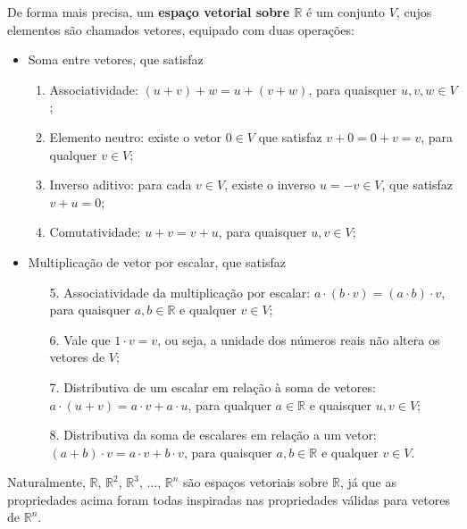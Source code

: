 \documentclass[../livro.tex]{subfiles}  %
\begin{document}
De forma mais precisa, um \textbf{espaço vetorial sobre $\mathbb{R}$} é um conjunto $V$, cujos elementos são chamados vetores, equipado com duas operações:
\begin{itemize}
	\item Soma entre vetores, que satisfaz
	\begin{enumerate}
		\item Associatividade: $(u+v)+w=u+(v+w)$, para quaisquer $u,v,w \in V$;
		\item Elemento neutro: existe o vetor $0 \in V$ que satisfaz $v+0=0+v=v$, para qualquer $v \in V$;
		\item Inverso aditivo: para cada $v \in V$, existe o inverso $u= -v \in V$, que satisfaz $v+u=0$;
		\item Comutatividade: $u+v = v+u$, para quaisquer $u, v \in V$;
	\end{enumerate}
	\item Multiplicação de vetor por escalar, que satisfaz
	\begin{enumerate}
		\item[5.] Associatividade da multiplicação por escalar: $a\cdot (b\cdot v)=(a\cdot b)\cdot v$, para quaisquer $a,b \in \mathbb{R}$ e qualquer $v \in V$;
		\item[6.] Vale que $1 \cdot v = v$, ou seja, a unidade dos números reais não altera os vetores de $V$;
		\item[7.] Distributiva de um escalar em relação à soma de vetores: $a \cdot (u+v) = a\cdot v+a\cdot u$, para qualquer $a \in \mathbb{R}$ e quaisquer $u,v \in V$;
		\item[8.] Distributiva da soma de escalares em relação a um vetor: $(a+b) \cdot v = a \cdot v+b \cdot v$, para quaisquer $a,b \in \mathbb{R}$ e qualquer $v \in V$.
	\end{enumerate}
\end{itemize}

\begin{example}
	Naturalmente, $\mathbb{R}$, $\mathbb{R}^2$, $\mathbb{R}^3$, ..., $\mathbb{R}^n$ são espaços vetoriais sobre $\mathbb{R}$, já que as propriedades acima foram todas inspiradas nas propriedades válidas para vetores de $\mathbb{R}^n$.
\end{example}
\end{document}
